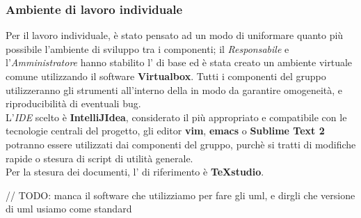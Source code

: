 \documentclass{scalatekids-article}
\begin{document}
\subsubsection{Ambiente di lavoro individuale}
Per il lavoro individuale, è stato pensato ad un modo di uniformare quanto più
possibile l'ambiente di sviluppo tra i componenti; il \textit{Responsabile} e
l'\textit{Amministratore} hanno stabilito l' di base ed è stata creato
un ambiente virtuale comune utilizzando il software \textbf{Virtualbox}. Tutti i
componenti del gruppo utilizzeranno gli strumenti all'interno della
 in modo da garantire omogeneità, e riproducibilità di
eventuali bug.\\ L'\textit{IDE} scelto è \textbf{IntelliJIdea}, considerato il
più appropriato e compatibile con le tecnologie centrali del progetto, gli
editor \textbf{vim}, \textbf{emacs} o \textbf{Sublime Text 2} potranno essere
utilizzati dai componenti del gruppo, purchè si tratti di modifiche rapide o
stesura di script di utilità generale.\\
Per la stesura dei documenti, l' di riferimento è \textbf{TeXstudio}.


// TODO: manca il software che utilizziamo per fare gli uml, e dirgli che versione di uml usiamo come standard
\end{document}
